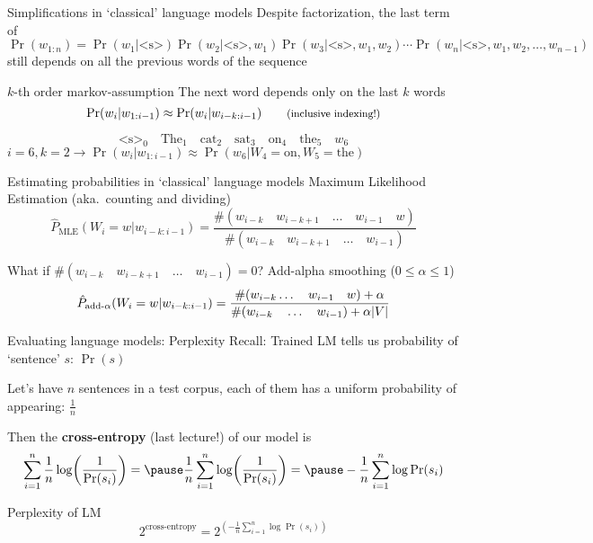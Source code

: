 \documentclass[12pt,aspectratio=169,handout]{beamer}
\begin{document}
\begin{frame}{Simplifications in `classical' language models}
Despite factorization, the last term of
$
\Pr(w_{1:n}) = \Pr(w_1 | \text{<s>}) \Pr (w_2 | \text{<s>}, w_1) \Pr(w_3 | \text{<s>}, w_1, w_2) \cdots \Pr(w_n | \text{<s>}, w_1, w_2, \ldots, w_{n-1})
$
still depends on all the previous words of the sequence

\begin{block}{$k$-th order markov-assumption}
The next word depends only on the last $k$ words
$$
\Pr(w_{i} | w_{1:i-1}) \approx \Pr (w_{i} | w_{i-k:i-1}) \qquad \text{\footnotesize{(inclusive indexing!)}}
$$
\end{block}
\pause
$$
\text{<s>}_0 \quad \text{The}_1 \quad \text{cat}_2 \quad \text{sat}_3 \quad \text{on}_4 \quad \text{the}_5 \quad w_6
$$
$i = 6, k=2 \to \Pr(w_{i} | w_{1:i-1}) \approx \Pr(w_6 | W_4 = \text{on}, W_5 = \text{the})$
\end{frame}

\begin{frame}{Estimating probabilities in `classical' language models}
Maximum Likelihood Estimation (aka.\ counting and dividing)
$$
\hat{P}_{\text{MLE}}(W_i = w | w_{i - k:i - 1}) = \frac{\#(w_{i-k} \quad w_{i-k+1} \quad \ldots \quad w_{i-1} \quad w)}{\#(w_{i-k} \quad w_{i-k+1} \quad \ldots \quad w_{i-1})}
$$
\begin{block}{What if $\#(w_{i-k} \quad w_{i-k+1} \quad \ldots \quad w_{i-1}) = 0$?}
\pause
Add-alpha smoothing ($0 \leq \alpha \leq 1$)
$$
\hat{P}_{\text{add-}\alpha}(W_i = w | w_{i - k:i - 1}) =
\frac{\#(w_{i-k} \ldots \quad w_{i-1} \quad w) + \alpha}
{\#(w_{i-k} \quad \ldots \quad w_{i-1}) + \alpha \abs{V}}
$$
\end{block}

\end{frame}


\begin{frame}{Evaluating language models: Perplexity}
Recall: Trained LM tells us probability of `sentence' $s$: $\Pr(s)$

\pause
Let's have $n$ sentences in a test corpus, each of them has a uniform probability of appearing: $\frac{1}{n}$

\pause
Then the \textbf{cross-entropy} (last lecture!) of our model is
$$
\sum_{i = 1}^{n} \frac{1}{n} \log (\frac{1}{\Pr(s_i)}) = \pause
\frac{1}{n} \sum_{i = 1}^{n} \log (\frac{1}{\Pr(s_i)}) = \pause
- \frac{1}{n} \sum_{i = 1}^{n} \log \Pr(s_i)
$$
\pause \begin{block}{Perplexity of LM}
$$
2^{\text{cross-entropy}} = 
2^{\left(- \frac{1}{n} \sum_{i = 1}^{n} \log \Pr(s_i)\right)}
$$
\end{block}

\end{frame}
\end{document}
